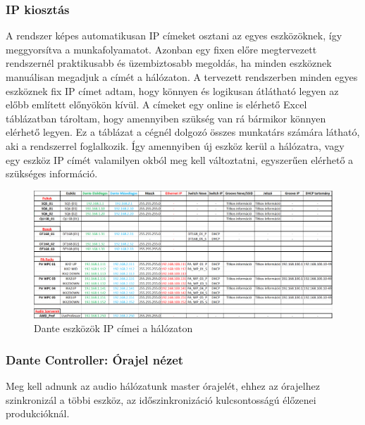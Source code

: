 \subsubsection{IP kiosztás}
A rendszer képes automatikusan IP címeket osztani az egyes eszközöknek, 
így meggyorsítva a munkafolyamatot.
Azonban egy fixen előre megtervezett rendszernél praktikusabb és
üzembiztosabb megoldás, ha minden eszköznek manuálisan megadjuk a címét a
hálózaton. A tervezett rendszerben minden egyes eszköznek fix IP címet adtam,
hogy könnyen és logikusan átlátható legyen az előbb említett előnyökön kívül.
A címeket egy online is elérhető Excel táblázatban tároltam, hogy amennyiben szükség van rá
bármikor könnyen elérhető legyen. Ez a táblázat a cégnél dolgozó összes munkatárs számára látható,
aki a rendszerrel foglalkozik. Így amennyiben új eszköz kerül a hálózatra, vagy egy eszköz IP címét
valamilyen okból meg kell változtatni, egyszerűen elérhető a szükséges információ.

\begin{figure}[H]
    \centering
    \includegraphics[width=\textwidth, keepaspectratio]{figures/dante_ips.png}
    \caption{Dante eszközök IP címei a hálózaton}\label{fig:dante_ips}
\end{figure}





\subsubsection{Dante Controller: Órajel nézet}
Meg kell adnunk az audio hálózatunk master órajelét, ehhez az órajelhez
szinkronizál a többi eszköz, az időszinkronizáció kulcsontosságú élőzenei
produkcióknál.



